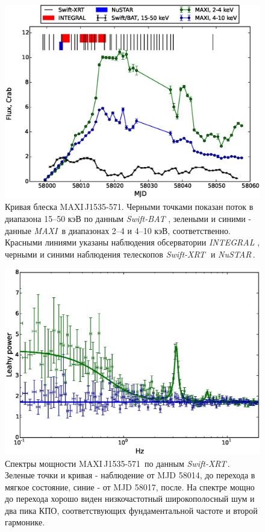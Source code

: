 \documentclass{pazhb}
\def\maxisrc{MAXI\,J1535-571}
\def\maxi{{\em MAXI}}
\def\swiftx{{\em Swift-XRT\,}}
\def\swiftb{{\em Swift-BAT\,}}
\def\nustar{{\em NuSTAR\,}}
\def\integral{{\em INTEGRAL\,}}
\begin{document}
\begin{figure}
\centerline{\includegraphics[scale=0.75]{overall_lc_v02.eps}}
\caption{Кривая блеска \maxisrc. Черными точками показан поток в диапазона 15--50 кэВ по данным \swiftb\,, зелеными и синими - данные \maxi\, в диапазонах 2--4 и 4--10 кэВ, соответственно. Красными линиями указаны наблюдения обсерватории \integral\,, черными и синими наблюдения телескопов \swiftx\, и \nustar. }
\label{fig:lc}
\end{figure} 

\begin{figure}
\centerline{\includegraphics[width=\linewidth]{transition_v01.eps}}
\caption{Спектры мощности \maxisrc\, по данным \swiftx. Зеленые точки и кривая - наблюдение от MJD 58014, до перехода в мягкое состояние, синие - от MJD 58017, после. На спектре мощно до перехода хорошо виден низкочастотный широкополосный шум и два пика КПО, соответствующих фундаментальной частоте и второй гармонике.}
\label{fig:powtrans}
\end{figure}
\end{document}
